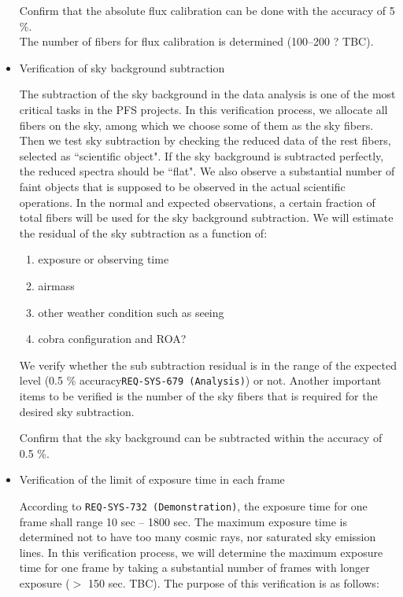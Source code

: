 \begin{itemize}
\begin{itembox}[l]{}
Confirm that the absolute flux calibration can be done with the accuracy of 5 \%. \\
The number of fibers for flux calibration is determined (100--200 ? TBC).
\end{itembox}

\item{Verification of sky background subtraction}

The subtraction of the sky background in the data analysis is one of the most critical tasks in the PFS projects. 
In this verification process, we allocate all fibers on the sky, among which we choose some of them as the sky fibers.
Then we test sky subtraction by checking the reduced data of the rest fibers, selected as ``scientific object".
If the sky background is subtracted perfectly, the reduced spectra should be ``flat". 
We also observe a substantial number of faint objects that is supposed to be observed in the actual scientific operations. In the normal and expected observations, a certain fraction of total fibers will be used for the sky background subtraction. We will estimate the residual of the sky subtraction as a function of:
\begin{enumerate}
\item{exposure or observing time}
\item{airmass}
\item{other weather condition such as seeing}
\item{cobra configuration and ROA?}
\end{enumerate}

We verify whether the sub subtraction residual is in the range of the expected level (0.5 \% accuracy{\tt REQ-SYS-679 (Analysis)}) or not. 
Another important items to be verified is the number of the sky fibers that is required for the desired sky subtraction.

\begin{itembox}[l]{}
Confirm that the sky background can be subtracted within the accuracy of 0.5 \%.
\end{itembox}

\item{Verification of the limit of exposure time in each frame}

According to {\tt REQ-SYS-732 (Demonstration)}, the exposure time for one frame shall range 10 sec -- 1800 sec. 
The maximum exposure time is determined not to have too many cosmic rays, nor saturated sky emission lines.
In this verification process, we will determine the maximum exposure time for one frame by taking a substantial number of frames with longer exposure ($>$ 150 sec. TBC). 
The purpose of this verification is as follows:


\end{itemize}
